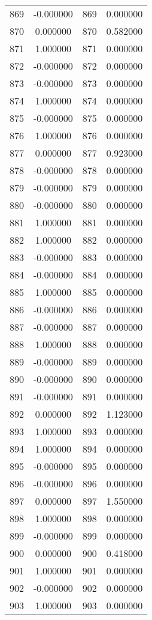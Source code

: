 \documentclass[12pt]{article}
\begin{document}
\begin{longtable}{@{}cccc@{}}
869 & -0.000000 & 869 & 0.000000 \\
870 & 0.000000 & 870 & 0.582000 \\
871 & 1.000000 & 871 & 0.000000 \\
872 & -0.000000 & 872 & 0.000000 \\
873 & -0.000000 & 873 & 0.000000 \\
874 & 1.000000 & 874 & 0.000000 \\
875 & -0.000000 & 875 & 0.000000 \\
876 & 1.000000 & 876 & 0.000000 \\
877 & 0.000000 & 877 & 0.923000 \\
878 & -0.000000 & 878 & 0.000000 \\
879 & -0.000000 & 879 & 0.000000 \\
880 & -0.000000 & 880 & 0.000000 \\
881 & 1.000000 & 881 & 0.000000 \\
882 & 1.000000 & 882 & 0.000000 \\
883 & -0.000000 & 883 & 0.000000 \\
884 & -0.000000 & 884 & 0.000000 \\
885 & 1.000000 & 885 & 0.000000 \\
886 & -0.000000 & 886 & 0.000000 \\
887 & -0.000000 & 887 & 0.000000 \\
888 & 1.000000 & 888 & 0.000000 \\
889 & -0.000000 & 889 & 0.000000 \\
890 & -0.000000 & 890 & 0.000000 \\
891 & -0.000000 & 891 & 0.000000 \\
892 & 0.000000 & 892 & 1.123000 \\
893 & 1.000000 & 893 & 0.000000 \\
894 & 1.000000 & 894 & 0.000000 \\
895 & -0.000000 & 895 & 0.000000 \\
896 & -0.000000 & 896 & 0.000000 \\
897 & 0.000000 & 897 & 1.550000 \\
898 & 1.000000 & 898 & 0.000000 \\
899 & -0.000000 & 899 & 0.000000 \\
900 & 0.000000 & 900 & 0.418000 \\
901 & 1.000000 & 901 & 0.000000 \\
902 & -0.000000 & 902 & 0.000000 \\
903 & 1.000000 & 903 & 0.000000 \\

\end{longtable}
\end{document}
